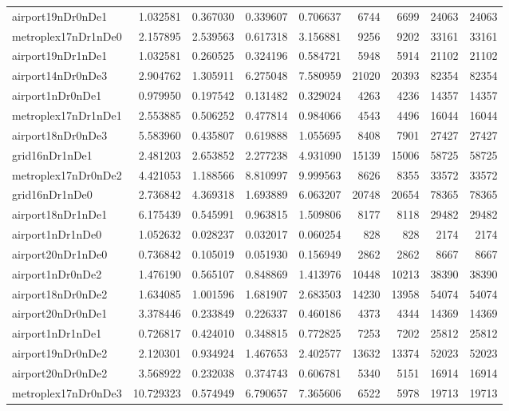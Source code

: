 \begin{longtable}{|l|r|r|r|r|r|r|r|r|}
airport19nDr0nDe1 & 1.032581 & 0.367030 & 0.339607 & 0.706637 & 6744 & 6699 & 24063 & 24063 \\
metroplex17nDr1nDe0 & 2.157895 & 2.539563 & 0.617318 & 3.156881 & 9256 & 9202 & 33161 & 33161 \\
airport19nDr1nDe1 & 1.032581 & 0.260525 & 0.324196 & 0.584721 & 5948 & 5914 & 21102 & 21102 \\
airport14nDr0nDe3 & 2.904762 & 1.305911 & 6.275048 & 7.580959 & 21020 & 20393 & 82354 & 82354 \\
airport1nDr0nDe1 & 0.979950 & 0.197542 & 0.131482 & 0.329024 & 4263 & 4236 & 14357 & 14357 \\
metroplex17nDr1nDe1 & 2.553885 & 0.506252 & 0.477814 & 0.984066 & 4543 & 4496 & 16044 & 16044 \\
airport18nDr0nDe3 & 5.583960 & 0.435807 & 0.619888 & 1.055695 & 8408 & 7901 & 27427 & 27427 \\
grid16nDr1nDe1 & 2.481203 & 2.653852 & 2.277238 & 4.931090 & 15139 & 15006 & 58725 & 58725 \\
metroplex17nDr0nDe2 & 4.421053 & 1.188566 & 8.810997 & 9.999563 & 8626 & 8355 & 33572 & 33572 \\
grid16nDr1nDe0 & 2.736842 & 4.369318 & 1.693889 & 6.063207 & 20748 & 20654 & 78365 & 78365 \\
airport18nDr1nDe1 & 6.175439 & 0.545991 & 0.963815 & 1.509806 & 8177 & 8118 & 29482 & 29482 \\
airport1nDr1nDe0 & 1.052632 & 0.028237 & 0.032017 & 0.060254 & 828 & 828 & 2174 & 2174 \\
airport20nDr1nDe0 & 0.736842 & 0.105019 & 0.051930 & 0.156949 & 2862 & 2862 & 8667 & 8667 \\
airport1nDr0nDe2 & 1.476190 & 0.565107 & 0.848869 & 1.413976 & 10448 & 10213 & 38390 & 38390 \\
airport18nDr0nDe2 & 1.634085 & 1.001596 & 1.681907 & 2.683503 & 14230 & 13958 & 54074 & 54074 \\
airport20nDr0nDe1 & 3.378446 & 0.233849 & 0.226337 & 0.460186 & 4373 & 4344 & 14369 & 14369 \\
airport1nDr1nDe1 & 0.726817 & 0.424010 & 0.348815 & 0.772825 & 7253 & 7202 & 25812 & 25812 \\
airport19nDr0nDe2 & 2.120301 & 0.934924 & 1.467653 & 2.402577 & 13632 & 13374 & 52023 & 52023 \\
airport20nDr0nDe2 & 3.568922 & 0.232038 & 0.374743 & 0.606781 & 5340 & 5151 & 16914 & 16914 \\
metroplex17nDr0nDe3 & 10.729323 & 0.574949 & 6.790657 & 7.365606 & 6522 & 5978 & 19713 & 19713 \\

\end{longtable}
